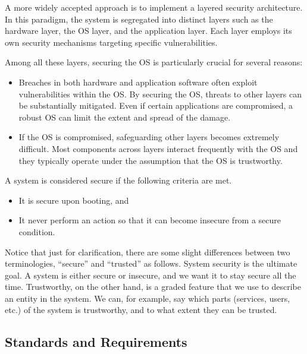 A more widely accepted approach is to implement a layered security architecture. In this paradigm, the system is segregated into distinct layers such as the hardware layer, the OS layer, and the application layer. Each layer employs its own security mechanisms targeting specific vulnerabilities.

Among all these layers, securing the OS is particularly crucial for several reasons:
\begin{itemize}
	\item Breaches in both hardware and application software often exploit vulnerabilities within the OS. By securing the OS, threats to other layers can be substantially mitigated. Even if certain applications are compromised, a robust OS can limit the extent and spread of the damage.
	\item If the OS is compromised, safeguarding other layers becomes extremely difficult. Most components across layers interact frequently with the OS and they typically operate under the assumption that the OS is trustworthy.
\end{itemize}

A system is considered secure if the following criteria are met.
\begin{itemize}
	\item It is secure upon booting, and
	\item It never perform an action so that it can become insecure from a secure condition. 
\end{itemize}
Notice that just for clarification, there are some slight differences between two terminologies, ``secure'' and ``trusted'' as follows. System security is the ultimate goal. A system is either secure or insecure, and we want it to stay secure all the time. Trustworthy, on the other hand, is a graded feature that we use to describe an entity in the system. We can, for example, say which parts (services, users, etc.) of the system is trustworthy, and to what extent they can be trusted.

\subsection{Standards and Requirements}

